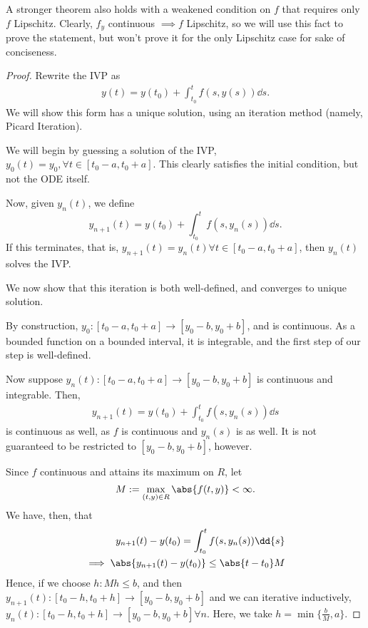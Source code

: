 \begin{remark}
    A stronger theorem also holds with a weakened condition on $f$ that requires only $f$ Lipschitz. Clearly, $f_y$ continuous $\implies f$ Lipschitz, so we will use this fact to prove the statement, but won't prove it for the only Lipschitz case for sake of conciseness.
\end{remark}

\begin{proof}
    Rewrite the IVP as 
    \begin{align*}
        y(t) = y(t_0) + \int_{t_0}^t f(s, y(s)) \dd{s}.    
    \end{align*}
    We will show this form has a unique solution, using an iteration method (namely, Picard Iteration).

    We will begin by guessing a solution of the IVP, $y_0(t) = y_0, \forall t \in [t_0 - a, t_0 + a]$. This clearly satisfies the initial condition, but not the ODE itself.
    
    Now, given $y_{n}(t)$, we define \[
    y_{n+1}(t) = y(t_0) + \int_{t_0}^t f(s, y_{n}(s)) \dd{s}.    
    \]
    If this terminates, that is, $y_{n+1}(t) = y_n(t) \forall t \in [t_0 - a, t_0 + a]$, then $y_n(t)$ solves the IVP.

    We now show that this iteration is both well-defined, and converges to unique solution.

    By construction, $y_0 : [t_0 - a, t_0 + a] \to [y_0 - b, y_0 + b]$, and is continuous. As a bounded function on a bounded interval, it is integrable, and the first step of our step is well-defined.

    Now suppose $y_n(t): [t_0 - a, t_0 + a] \to [y_0 - b, y_0 + b]$ is continuous and integrable. Then, \begin{align*}
        y_{n+1}(t) = y(t_0) + \int_{t_0}^t f(s, y_n(s)) \dd{s}
    \end{align*}
    is continuous as well, as $f$ is continuous and $y_n(s)$ is as well. It is not guaranteed to be restricted to $[y_0 - b, y_0 + b]$, however.

    Since $f$ continuous and attains its maximum on $R$, let \[
    M := \max_{(t, y) \in R} \abs{f(t, y)} < \infty.
    \]
    We have, then, that \begin{align*}
        y_{n+1}(t) - y(t_0) = \int_{t_0}^{t}f(s, y_n(s)) \dd{s}\\
        \implies \abs{y_{n+1}(t) - y(t_0)} \leq \abs{t - t_0} M
    \end{align*}
    Hence, if we choose $h : Mh \leq b$, and then $y_{n+1}(t) : [t_0 - h, t_0 + h] \to [y_0 - b, y_0 + b]$ and we can iterative inductively, $y_n(t) : [t_0 - h, t_0 +h] \to [y_0 - b, y_0 + b] \forall n$. Here, we take $h = \min \{\frac{b}{M}, a\}$.


\end{proof}
